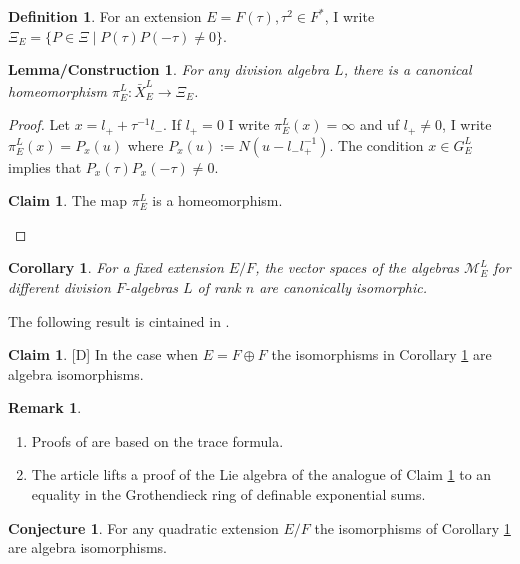 \documentclass[11pt,a4paper,twoside]{amsart}
\newtheorem{lc}[theorem]{Lemma/Construction}
\newtheorem{corollary}[theorem]{Corollary}
\theoremstyle{definition}
\newtheorem{definition}[theorem]{Definition}
\newtheorem{claim}[theorem]{Claim}
\newtheorem{conjecture}[theorem]{Conjecture}
\newtheorem{remark}[theorem]{Remark}
\newcommand{\mcM}{\mathcal M}
\begin{document}
\begin{definition} 
For an extension $E = F(\tau), \tau ^2 \in F^\ast$, I write $\Xi_E = \{P \in \Xi \mid P(\tau)P(-\tau) \neq 0\}$. 
\end{definition}

\begin{lc} 
For any division algebra $L$, there is a canonical homeomorphism $\pi^L_E: \bar X^L_E \to \Xi_E$.
\end{lc}

\begin{proof} 
Let $x = l_+ + \tau^{-1}l_-$. If $l_+ =0$ I write $\pi^L_E (x) = \infty$ and  uf $l_+ \neq 0$, I write $\pi^L_E (x) = P_x(u)$ where $P_x(u) := N (u - l_-l_+^{-1})$. The condition $x \in G^L_E$ implies that $P_x(\tau)P_x(-\tau) \neq 0$.

\begin{claim}
The map $\pi^L_E$ is a homeomorphism.\end{claim}
\end{proof}

\begin{corollary}\label{is1} 
For a fixed extension $E/F$, the vector spaces of the algebras $\mcM^L_E$ for different division $F$-algebras $L$ of rank $n$ are canonically isomorphic.
\end{corollary}
 The following result  is cintained in  \cite{DKV}.

\begin{claim}\label{D}[D]  In the case when  $E = F \oplus F$ the isomorphisms in Corollary \ref{is1} are algebra isomorphisms.
\end{claim} 
\begin{remark} \begin{enumerate}
\item Proofs of  \cite{DKV} are 
based on the trace formula. 
\item The article  \cite{HK} lifts a proof of the Lie algebra of the analogue of Claim \ref{D} to an equality in the Grothendieck ring of definable exponential sums. \end{enumerate}



\end{remark}

\begin{conjecture}\label{conj1} For any quadratic extension $E/F$ the isomorphisms of Corollary \ref{is1} are algebra isomorphisms.

\end{conjecture}
\end{document}
